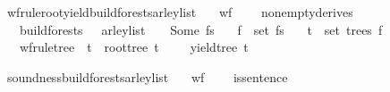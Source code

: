 \begin{isabellebody}
\isadelimproof
%
\endisadelimproof
%
\isatagproof
%
\endisatagproof
{\isafoldproof}%
%
\isadelimproof
%
\endisadelimproof
%
\begin{isamarkuptext}%
%
\end{isamarkuptext}\isamarkuptrue%
\isamarkupfalse%
\ wf{\isacharunderscore}{\kern0pt}rule{\isacharunderscore}{\kern0pt}root{\isacharunderscore}{\kern0pt}yield{\isacharunderscore}{\kern0pt}build{\isacharunderscore}{\kern0pt}forests{\isacharunderscore}{\kern0pt}{\isasymE}arley{\isacharunderscore}{\kern0pt}list{\isacharcolon}{\kern0pt}\isanewline
\ \ \ {\isachardoublequoteopen}wf{\isacharunderscore}{\kern0pt}{\isasymG}\ {\isasymG}{\isachardoublequoteclose}\isanewline
\ \ \ {\isachardoublequoteopen}nonempty{\isacharunderscore}{\kern0pt}derives\ {\isasymG}{\isachardoublequoteclose}\isanewline
\ \ \ {\isachardoublequoteopen}build{\isacharunderscore}{\kern0pt}forests\ {\isasymG}\ {\isasymomega}\ {\isacharparenleft}{\kern0pt}{\isasymE}arley{\isacharunderscore}{\kern0pt}list\ {\isasymG}\ {\isasymomega}{\isacharparenright}{\kern0pt}\ {\isacharequal}{\kern0pt}\ Some\ fs{\isachardoublequoteclose}\isanewline
\ \ \ {\isachardoublequoteopen}f\ {\isasymin}\ set\ fs{\isachardoublequoteclose}\isanewline
\ \ \ {\isachardoublequoteopen}t\ {\isasymin}\ set\ {\isacharparenleft}{\kern0pt}trees\ f{\isacharparenright}{\kern0pt}{\isachardoublequoteclose}\isanewline
\ \ \ {\isachardoublequoteopen}wf{\isacharunderscore}{\kern0pt}rule{\isacharunderscore}{\kern0pt}tree\ {\isasymG}\ t\ {\isasymand}\ root{\isacharunderscore}{\kern0pt}tree\ t\ {\isacharequal}{\kern0pt}\ {\isasymSS}\ {\isasymG}\ {\isasymand}\ yield{\isacharunderscore}{\kern0pt}tree\ t\ {\isacharequal}{\kern0pt}\ {\isasymomega}{\isachardoublequoteclose}%
\isadelimproof
%
\endisadelimproof
%
\isatagproof
%
\endisatagproof
{\isafoldproof}%
%
\isadelimproof
%
\endisadelimproof
%
\begin{isamarkuptext}%
%
\end{isamarkuptext}\isamarkuptrue%
\isamarkupfalse%
\ soundness{\isacharunderscore}{\kern0pt}build{\isacharunderscore}{\kern0pt}forests{\isacharunderscore}{\kern0pt}{\isasymE}arley{\isacharunderscore}{\kern0pt}list{\isacharcolon}{\kern0pt}\isanewline
\ \ \ {\isachardoublequoteopen}wf{\isacharunderscore}{\kern0pt}{\isasymG}\ {\isasymG}{\isachardoublequoteclose}\isanewline
\ \ \ {\isachardoublequoteopen}is{\isacharunderscore}{\kern0pt}sentence\ {\isasymG}\ {\isasymomega}{\isachardoublequoteclose}\isanewline

\end{isabellebody}
